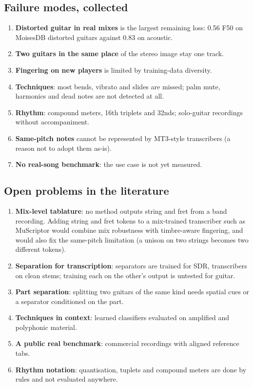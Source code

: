 \subsection{Failure modes, collected}

\begin{enumerate}
\item \textbf{Distorted guitar in real mixes} is the largest remaining loss:
  0.56 F50 on MoisesDB distorted guitars against 0.83 on acoustic.
\item \textbf{Two guitars in the same place} of the stereo image stay one
  track.
\item \textbf{Fingering on new players} is limited by training-data diversity.
\item \textbf{Techniques}: most bends, vibrato and slides are missed; palm
  mute, harmonics and dead notes are not detected at all.
\item \textbf{Rhythm}: compound meters, 16th triplets and 32nds; solo-guitar
  recordings without accompaniment.
\item \textbf{Same-pitch notes} cannot be represented by MT3-style
  transcribers (a reason not to adopt them as-is).
\item \textbf{No real-song benchmark}: the use case is not yet measured.
\end{enumerate}

\subsection{Open problems in the literature}

\begin{enumerate}
\item \textbf{Mix-level tablature}: no method outputs string and fret from a
  band recording. Adding string and fret tokens to a mix-trained transcriber
  such as MuScriptor would combine mix robustness with timbre-aware fingering,
  and would also fix the same-pitch limitation (a unison on two strings becomes
  two different tokens).
\item \textbf{Separation for transcription}: separators are trained for SDR,
  transcribers on clean stems; training each on the other's output is untested
  for guitar.
\item \textbf{Part separation}: splitting two guitars of the same kind needs
  spatial cues or a separator conditioned on the part.
\item \textbf{Techniques in context}: learned classifiers evaluated on
  amplified and polyphonic material.
\item \textbf{A public real benchmark}: commercial recordings with aligned
  reference tabs.
\item \textbf{Rhythm notation}: quantisation, tuplets and compound meters are
  done by rules and not evaluated anywhere.
\end{enumerate}

